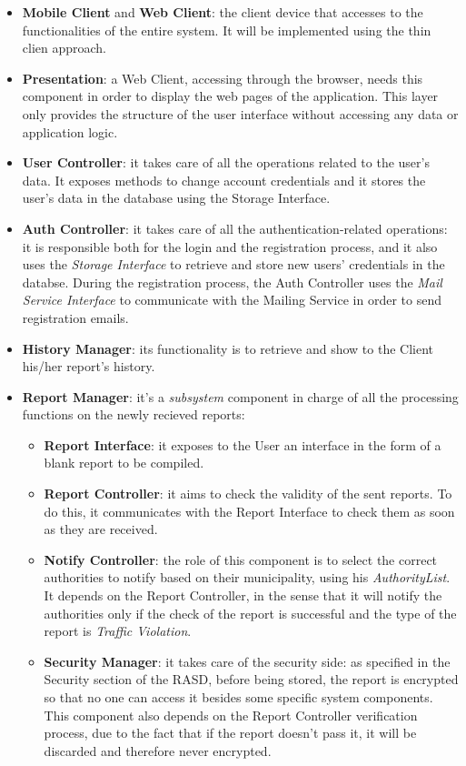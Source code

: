 \documentclass{report}
\begin{document}
\begin{itemize}
\item \textbf{Mobile Client} and \textbf{Web Client}: the client device that accesses to the functionalities of the entire system. It will be implemented using the thin clien approach.
\item \textbf{Presentation}: a Web Client, accessing through the browser, needs this component in order to display the web pages of the application. This layer only provides the structure of the user interface without accessing any data or application logic.
\item \textbf{User Controller}: it takes care of all the operations related to the user's data. It exposes methods to change account credentials and it stores the user's data in the database using the Storage Interface.
\item \textbf{Auth Controller}: it takes care of all the authentication-related operations: it is responsible both for the login and the registration process, and it also uses the \textit{Storage Interface} to retrieve and store new users' credentials in the databse. During the registration process, the Auth Controller uses the \textit{Mail Service Interface} to communicate with the Mailing Service in order to send registration emails.
\item \textbf{History Manager}: its functionality is to retrieve and show to the Client his/her report's history.
\item \textbf{Report Manager}: it's a \textit{subsystem} component in charge of all the processing functions on the newly recieved reports:
\begin{itemize}
    \item \textbf{Report Interface}: it exposes to the User an interface in the form of a blank report to be compiled.
    \item \textbf{Report Controller}: it aims to check the validity of the sent reports. To do this, it communicates with the Report Interface to check them as soon as they are received.
    \item \textbf{Notify Controller}: the role of this component is to select the correct authorities to notify based on their municipality, using his \textit{AuthorityList}. It depends on the Report Controller, in the sense that it will notify the authorities only if the check of the report is successful and the type of the report is \textit{Traffic Violation}.
    \item \textbf{Security Manager}: it takes care of the security side: as specified in the Security section of the RASD, before being stored, the report is encrypted so that no one can access it besides some specific system components. This component also depends on the Report Controller verification process, due to the fact that if the report doesn't pass it, it will be discarded and therefore never encrypted.

\end{itemize}
\end{itemize}
\end{document}
